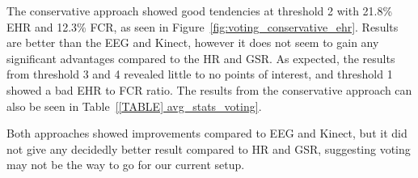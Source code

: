 The conservative approach showed good tendencies at threshold 2 with 21.8\% EHR and 12.3\% FCR, as seen in Figure~\ref{fig:voting_conservative_ehr}.
Results are better than the EEG and Kinect, however it does not seem to gain any significant advantages compared to the HR and GSR.
As expected, the results from threshold 3 and 4 revealed little to no points of interest, and threshold 1 showed a bad EHR to FCR ratio. 
The results from the conservative approach can also be seen in Table~\ref{[TABLE] avg_stats_voting}.

Both approaches showed improvements compared to EEG and Kinect, but it did not give any decidedly better result compared
to HR and GSR, suggesting voting may not be the way to go for our current setup.

